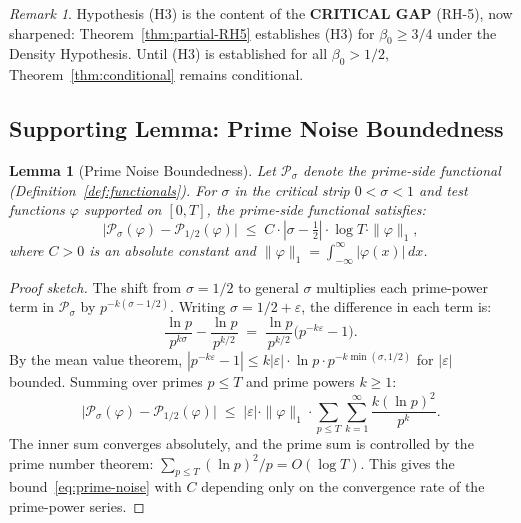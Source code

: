 \documentclass[11pt]{article}
\newtheorem{lemma}[theorem]{Lemma}
\theoremstyle{remark}
\newtheorem{remark}[theorem]{Remark}
\begin{document}
\begin{remark}
Hypothesis (H3) is the content of the \textbf{CRITICAL GAP} (RH-5), now
sharpened: Theorem~\ref{thm:partial-RH5} establishes (H3) for $\beta_0 \geq 3/4$
under the Density Hypothesis.  Until (H3) is established for all $\beta_0 > 1/2$,
Theorem~\ref{thm:conditional} remains conditional.
\end{remark}

\subsection{Supporting Lemma: Prime Noise Boundedness}
\label{subsec:prime-noise}

\begin{lemma}[Prime Noise Boundedness]
\label{lem:prime-noise}
Let $\mathcal{P}_\sigma$ denote the prime-side functional
(Definition~\ref{def:functionals}).
For $\sigma$ in the critical strip $0 < \sigma < 1$ and test functions
$\varphi$ supported on $[0, T]$, the prime-side functional satisfies:
\begin{equation}\label{eq:prime-noise}
  \bigl|\mathcal{P}_\sigma(\varphi) - \mathcal{P}_{1/2}(\varphi)\bigr|
  \;\leq\;
  C \cdot |\sigma - \tfrac{1}{2}| \cdot \log T \cdot \|\varphi\|_1,
\end{equation}
where $C > 0$ is an absolute constant and $\|\varphi\|_1 = \int_{-\infty}^{\infty}
|\varphi(x)|\,dx$.
\end{lemma}

\begin{proof}[Proof sketch]
The shift from $\sigma = 1/2$ to general $\sigma$ multiplies each prime-power
term in $\mathcal{P}_\sigma$ by $p^{-k(\sigma - 1/2)}$.
Writing $\sigma = 1/2 + \varepsilon$, the difference in each term is:
\[
  \frac{\ln p}{p^{k\sigma}} - \frac{\ln p}{p^{k/2}}
  \;=\;
  \frac{\ln p}{p^{k/2}} \bigl(p^{-k\varepsilon} - 1\bigr).
\]
By the mean value theorem, $|p^{-k\varepsilon} - 1| \leq k|\varepsilon| \cdot
\ln p \cdot p^{-k\min(\sigma, 1/2)}$ for $|\varepsilon|$ bounded.
Summing over primes $p \leq T$ and prime powers $k \geq 1$:
\[
  \bigl|\mathcal{P}_\sigma(\varphi) - \mathcal{P}_{1/2}(\varphi)\bigr|
  \;\leq\;
  |\varepsilon| \cdot \|\varphi\|_1 \cdot \sum_{p \leq T} \sum_{k=1}^{\infty}
    \frac{k(\ln p)^2}{p^{k}} .
\]
The inner sum converges absolutely, and the prime sum is controlled by the prime
number theorem: $\sum_{p \leq T} (\ln p)^2 / p = O(\log T)$.
This gives the bound~\eqref{eq:prime-noise} with $C$ depending only on the
convergence rate of the prime-power series.
\end{proof}
\end{document}
